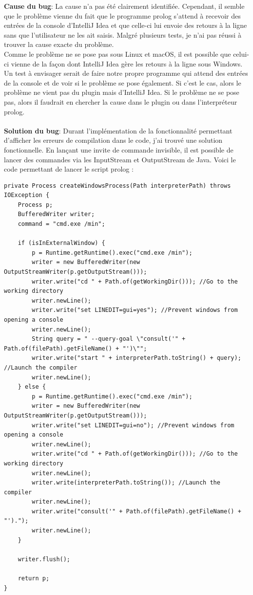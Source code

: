 \noindent \textbf{Cause du bug}: La cause n'a pas été clairement identifiée. Cependant, il semble que le problème vienne du fait que le programme prolog s'attend à recevoir des entrées de la console d'IntelliJ Idea et que celle-ci lui envoie des retours à la ligne sans que l'utilisateur ne les ait saisis. Malgré plusieurs tests, je n'ai pas réussi à trouver la cause exacte du problème.
\\
Comme le problème ne se pose pas sous Linux et macOS, il est possible que celui-ci vienne de la façon dont IntelliJ Idea gère les retours à la ligne sous Windows.
\\
Un test à envisager serait de faire notre propre programme qui attend des entrées de la console et de voir si le problème se pose également. Si c'est le cas, alors le problème ne vient pas du plugin mais d'IntelliJ Idea. Si le problème ne se pose pas, alors il faudrait en chercher la cause dans le plugin ou dans l'interpréteur prolog.
\\
\\
\textbf{Solution du bug}: Durant l'implémentation de la fonctionnalité permettant d'afficher les erreurs de compilation dans le code, j'ai trouvé une solution fonctionnelle.
\newdoubleline En lançant une invite de commande invisible, il est possible de lancer des commandes via les InputStream et OutputStream de Java. Voici le code permettant de lancer le script prolog :
\begin{lstlisting}[caption={Code permettant de lancer le script prolog}, label={lst:run_script_prolog}]
private Process createWindowsProcess(Path interpreterPath) throws IOException {
    Process p;
    BufferedWriter writer;
    command = "cmd.exe /min";

    if (isInExternalWindow) {
        p = Runtime.getRuntime().exec("cmd.exe /min");
        writer = new BufferedWriter(new OutputStreamWriter(p.getOutputStream()));
        writer.write("cd " + Path.of(getWorkingDir())); //Go to the working directory
        writer.newLine();
        writer.write("set LINEDIT=gui=yes"); //Prevent windows from opening a console
        writer.newLine();
        String query = " --query-goal \"consult('" + Path.of(filePath).getFileName() + "')\"";
        writer.write("start " + interpreterPath.toString() + query); //Launch the compiler
        writer.newLine();
    } else {
        p = Runtime.getRuntime().exec("cmd.exe /min");
        writer = new BufferedWriter(new OutputStreamWriter(p.getOutputStream()));
        writer.write("set LINEDIT=gui=no"); //Prevent windows from opening a console
        writer.newLine();
        writer.write("cd " + Path.of(getWorkingDir())); //Go to the working directory
        writer.newLine();
        writer.write(interpreterPath.toString()); //Launch the compiler
        writer.newLine();
        writer.write("consult('" + Path.of(filePath).getFileName() + "').");
        writer.newLine();
    }

    writer.flush();

    return p;
}
\end{lstlisting}

